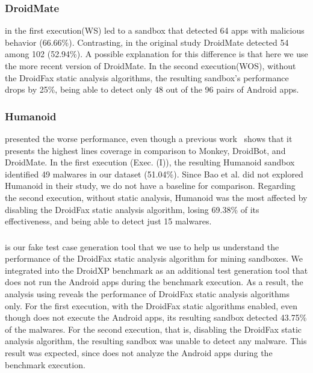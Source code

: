 \subsubsection*{DroidMate} in the first execution(WS) led to a sandbox that detected 64 apps with malicious behavior (66.66\%). Contrasting, in the original study DroidMate detected 54 among 102 (52.94\%). A possible explanation for this difference is that here we use the more recent version of DroidMate. In the second execution(WOS), without the DroidFax static analysis algorithms, the resulting sandbox's performance drops by 25\%, being able to detect only 48 out of the 96 pairs of Android apps. 


\subsubsection*{Humanoid} presented the worse performance, even though a previous
work~\cite{DBLP:conf/kbse/LiY0C19} shows that it presents the highest lines coverage in comparison to Monkey, DroidBot, and DroidMate. In the first execution (Exec. (I)), the resulting Humanoid sandbox identified 49 malwares in our dataset (51.04\%). Since Bao et al. did not explored Humanoid in their study, we do not have a baseline for comparison. Regarding the second execution, without static analysis, Humanoid was the most affected by disabling the DroidFax static analysis algorithm, losing 69.38\% of its effectiveness, and being able to detect just 15 malwares.

\subsubsection*{\joke} is our fake test case generation tool that we use to help us understand the performance of the DroidFax static analysis algorithm for mining sandboxes. We integrated \joke into the DroidXP benchmark as an additional test generation tool that does not run the Android apps during the benchmark execution. As a result, the analysis using \joke reveals the performance of DroidFax static analysis algorithms only. For the first execution, with the DroidFax static algorithms enabled, even though \joke does not execute the Android apps, its resulting sandbox detected 43.75\% of the malwares. For the second execution, that is, disabling the DroidFax static analysis algorithm, the resulting \joke sandbox was unable to detect any malware. This result was expected, since \joke does not analyze the Android apps during the benchmark execution.

